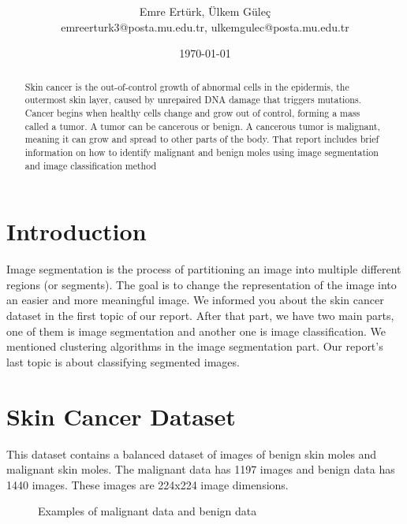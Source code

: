 \documentclass[onecolumn]{article}
\title{\spacecaps{Final Report: Skin Cancer: Malignant vs. Benign}\\ \normalsize \spacesc{CENG 3521, Data Mining} }
\author{Emre Ertürk, Ülkem Güleç\\emreerturk3@posta.mu.edu.tr, ulkemgulec@posta.mu.edu.tr}
\date{\today}
\begin{document}
\maketitle

\begin{abstract}
Skin cancer is the out-of-control growth of abnormal cells in the epidermis, the outermost skin layer, caused by unrepaired DNA damage that triggers mutations. Cancer begins when healthy cells change and grow out of control, forming a mass called a tumor. A tumor can be cancerous or benign. A cancerous tumor is malignant, meaning it can grow and spread to other parts of the body. That report includes brief information on how to identify malignant and benign moles using image segmentation and image classification method



\end{abstract}

\section{Introduction}
Image segmentation is the process of partitioning an image into multiple different regions (or segments). The goal is to change the representation of the image into an easier and more meaningful image. We informed you about the skin cancer dataset in the first topic of our report. After that part, we have two main parts, one of them is image segmentation and another one is image classification. We mentioned clustering algorithms in the image segmentation part. Our report's last topic is about classifying segmented images.

\section{Skin Cancer Dataset}
This dataset contains a balanced dataset of images of benign skin moles and malignant skin moles. The malignant data has 1197 images and benign data has 1440 images. These images are 224x224 image dimensions.

\begin{figure}[H]
    \centering
    \subfloat
    \qquad
    \subfloat
    \caption{Examples of malignant data and benign data}%
    \label{fig:2}%
\end{figure}
\end{document}
